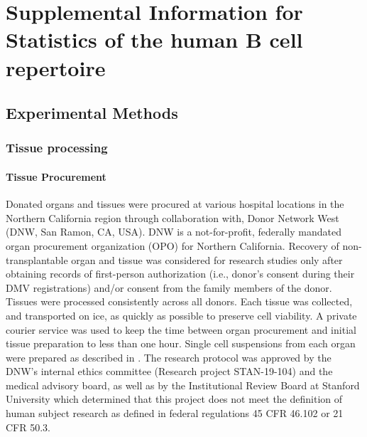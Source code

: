 
\newcommand{\Ne}{N_e}
\newcommand{\Ub}{U_b}
\newcommand{\dT}{{\Delta t}}
\newcommand{\T}{t}
\newcommand{\TdT}{{\T + \dT}}


\newcommand{\NCBIAccessionNumber}{[[XXXX]] }
\newcommand{\Github}{[[GITHUB]]}


\chapter{Supplemental Information for Statistics of the human B cell repertoire}
 
\section{Experimental Methods}
\subsection{Tissue processing}
\subsubsection{Tissue Procurement}
\noindent Donated organs and tissues were procured at various hospital locations in the Northern California region through collaboration with, Donor Network West (DNW, San Ramon, CA, USA). DNW is a not-for-profit, federally mandated organ procurement organization (OPO) for Northern California. Recovery of non-transplantable organ and tissue was considered for research studies only after obtaining records of first-person authorization (i.e., donor’s consent during their DMV registrations) and/or consent from the family members of the donor. Tissues were processed consistently across all donors. Each tissue was collected, and transported on ice, as quickly as possible to preserve cell viability. A private courier service was used to keep the time between organ procurement and initial tissue preparation to less than one hour. Single cell suspensions from each organ were prepared as described in . The research protocol was approved by the DNW’s internal ethics committee (Research project STAN-19-104) and the medical advisory board, as well as by the Institutional Review Board at Stanford University which determined that this project does not meet the definition of human subject research as defined in federal regulations 45 CFR 46.102 or 21 CFR 50.3.

